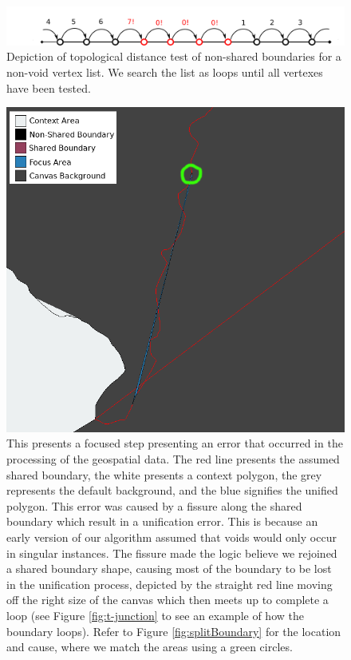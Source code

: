 \begin{figure}[hb]
\includegraphics[width=1\textwidth]{images/ch6/length}
\caption{Depiction of topological distance test of non-shared boundaries for a non-void vertex list. We search the list as loops until all vertexes have been tested.} \label{fig:length}
\end{figure}

\begin{figure}
\includegraphics[width=1\textwidth]{images/ch6/multipleVoids3}
\caption{This presents a focused step presenting an error that occurred in the processing of the geospatial data. The red line presents the assumed shared boundary, the white presents a context polygon, the grey represents the default background, and the blue signifies the unified polygon. This error was caused by a fissure along the shared boundary which result in a unification error. This is because an early version of our algorithm assumed that voids would only occur in singular instances. The fissure made the logic believe we rejoined a shared boundary shape, causing most of the boundary to be lost in the unification process, depicted by the straight red line moving off the right size of the canvas which then meets up to complete a loop (see Figure \ref{fig:t-junction} to see an example of how the boundary loops). Refer to Figure \ref{fig:splitBoundary} for the location and cause, where we match the areas using a green circles.} \label{fig:errorVoids}
\end{figure}

